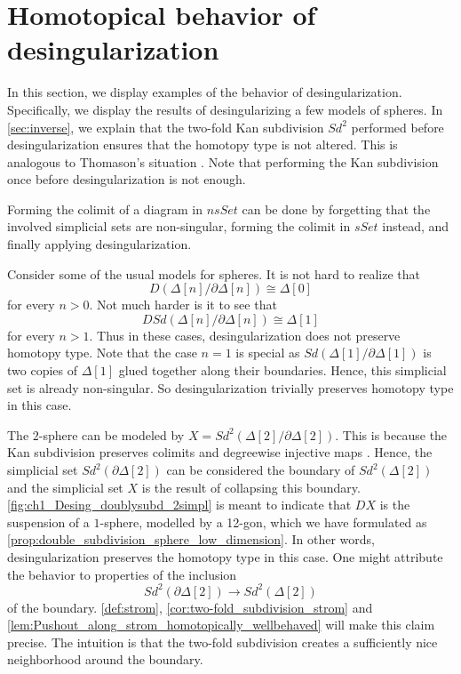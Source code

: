 

\section{Homotopical behavior of desingularization}
\label{sec:behavior}

In this section, we display examples of the behavior of desingularization. Specifically, we display the results of desingularizing a few models of spheres. In \cref{sec:inverse}, we explain that the two-fold Kan subdivision $Sd^2$ performed before desingularization ensures that the homotopy type is not altered. This is analogous to Thomason's situation \cite{Th80}. Note that performing the Kan subdivision once before desingularization is not enough.

Forming the colimit of a diagram in $nsSet$ can be done by forgetting that the involved simplicial sets are non-singular, forming the colimit in $sSet$ instead, and finally applying desingularization.

Consider some of the usual models for spheres. It is not hard to realize that
\[D(\Delta [n]/\partial \Delta [n])\cong \Delta [0]\]
for every $n>0$. Not much harder is it to see that
\[DSd(\Delta [n]/\partial \Delta [n])\cong \Delta [1]\]
for every $n>1$. Thus in these cases, desingularization does not preserve homotopy type. Note that the case $n=1$ is special as $Sd(\Delta [1]/\partial \Delta [1])$ is two copies of $\Delta [1]$ glued together along their boundaries. Hence, this simplicial set is already non-singular. So desingularization trivially preserves homotopy type in this case.

The $2$-sphere can be modeled by $X=Sd^2(\Delta [2]/\partial \Delta [2])$. This is because the Kan subdivision preserves colimits \cite[Cor.~4.2.11]{FP90} and degreewise injective maps \cite[Cor.~4.2.9]{FP90}. Hence, the simplicial set $Sd^2(\partial \Delta [2])$ can be considered the boundary of $Sd^2(\Delta [2])$ and the simplicial set $X$ is the result of collapsing this boundary. \cref{fig:ch1_Desing_doublysubd_2simpl} is meant to indicate that $DX$ is the suspension of a $1$-sphere, modelled by a 12-gon, which we have formulated as \cref{prop:double_subdivision_sphere_low_dimension}. In other words, desingularization preserves the homotopy type in this case. One might attribute the behavior to properties of the inclusion
\[Sd^2(\partial \Delta [2])\to Sd^2(\Delta [2])\]
of the boundary. \cref{def:strom}, \cref{cor:two-fold_subdivision_strom} and \cref{lem:Pushout_along_strom_homotopically_wellbehaved} will make this claim precise. The intuition is that the two-fold subdivision creates a sufficiently nice neighborhood around the boundary.

